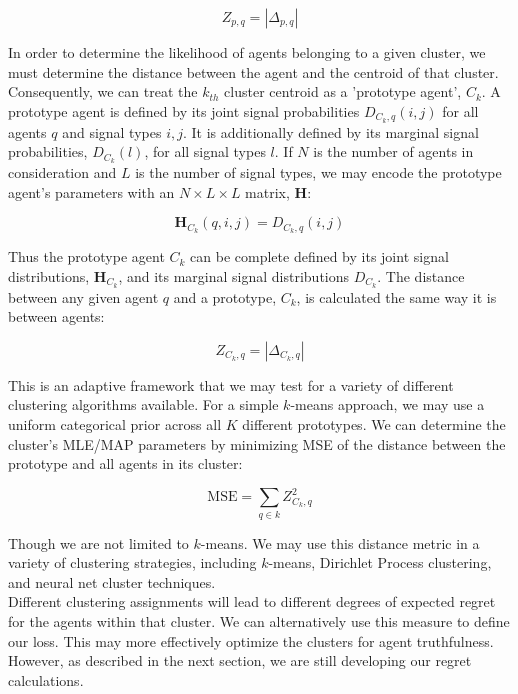 \documentclass[a4paper, 12pt]{article}
\begin{document}
$$ Z_{p,q} = | \Delta_{p,q} | $$

In order to determine the likelihood of agents belonging to a given cluster, we must determine the distance between the agent and the centroid of that cluster. Consequently, we can treat the $k_{th}$ cluster centroid as a ’prototype agent’, $C_k$. A prototype agent is defined by its joint signal probabilities $D_{C_k,q}(i,j)$ for all agents $q$ and signal types $i, j$. It is additionally defined by its marginal signal probabilities, $D_{C_k}(l)$, for all signal types $l$. If $N$ is the number of agents in consideration and $L$ is the number of signal types, we may encode the prototype agent's parameters with an $N \times L \times L$ matrix, \textbf{H}:  

$$ \mathbf{H}_{C_k}(q, i, j) = D_{C_k, q} (i, j) $$
	
	Thus the prototype agent $C_k$ can be complete defined by its joint signal distributions, $\mathbf{H}_{C_k}$, and its marginal signal distributions $D_{C_k}$. The distance between any given agent $q$ and a prototype, $C_k$, is calculated the same way it is between agents:
	
$$ Z_{C_k, q} = | \Delta_{C_k, q} | $$

	This is an adaptive framework that we may test for a variety of different clustering algorithms available. For a simple $k$-means approach, we may use a uniform categorical prior across all $K$ different prototypes. We can determine the cluster's MLE/MAP parameters by minimizing MSE of the distance between the prototype and all agents in its cluster:
	
$$ \textrm{MSE} = \sum_{q \in k} Z_{C_k, q}^2 $$

	Though we are not limited to $k$-means. We may use this distance metric in a variety of clustering strategies, including $k$-means, Dirichlet Process clustering, and neural net cluster techniques. \\
	
	Different clustering assignments will lead to different degrees of expected regret for the agents within that cluster. We can alternatively use this measure to define our loss. This may more effectively optimize the clusters for agent truthfulness. However, as described in the next section, we are still developing our regret calculations. 
\end{document}
